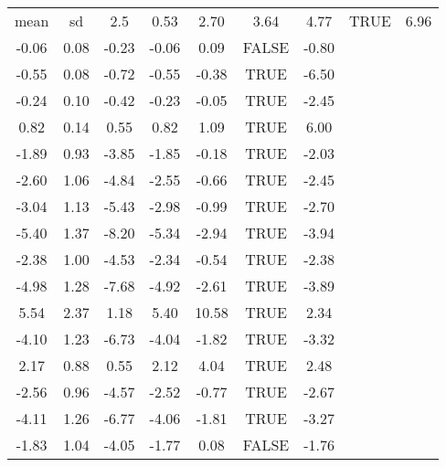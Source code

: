 \begin{table}[ht]
\centering
\begin{tabular}{|c|c|c|c|c|c|c|}
  \hline
mean & sd & 2.5%
   & 0.53 & 2.70 & 3.64 & 4.77 & TRUE & 6.96 \\ 
  -0.06 & 0.08 & -0.23 & -0.06 & 0.09 & FALSE & -0.80 \\ 
  -0.55 & 0.08 & -0.72 & -0.55 & -0.38 & TRUE & -6.50 \\ 
  -0.24 & 0.10 & -0.42 & -0.23 & -0.05 & TRUE & -2.45 \\ 
  0.82 & 0.14 & 0.55 & 0.82 & 1.09 & TRUE & 6.00 \\ 
  -1.89 & 0.93 & -3.85 & -1.85 & -0.18 & TRUE & -2.03 \\ 
  -2.60 & 1.06 & -4.84 & -2.55 & -0.66 & TRUE & -2.45 \\ 
  -3.04 & 1.13 & -5.43 & -2.98 & -0.99 & TRUE & -2.70 \\ 
  -5.40 & 1.37 & -8.20 & -5.34 & -2.94 & TRUE & -3.94 \\ 
  -2.38 & 1.00 & -4.53 & -2.34 & -0.54 & TRUE & -2.38 \\ 
  -4.98 & 1.28 & -7.68 & -4.92 & -2.61 & TRUE & -3.89 \\ 
  5.54 & 2.37 & 1.18 & 5.40 & 10.58 & TRUE & 2.34 \\ 
  -4.10 & 1.23 & -6.73 & -4.04 & -1.82 & TRUE & -3.32 \\ 
  2.17 & 0.88 & 0.55 & 2.12 & 4.04 & TRUE & 2.48 \\ 
  -2.56 & 0.96 & -4.57 & -2.52 & -0.77 & TRUE & -2.67 \\ 
  -4.11 & 1.26 & -6.77 & -4.06 & -1.81 & TRUE & -3.27 \\ 
  -1.83 & 1.04 & -4.05 & -1.77 & 0.08 & FALSE & -1.76 \\ 
   \hline
\end{tabular}
\end{table}
